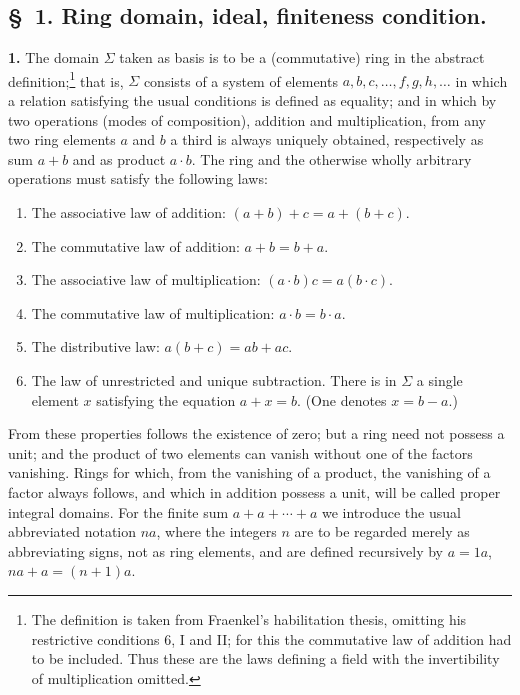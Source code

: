 \documentclass[11pt]{article}
\begin{document}
\subsection*{\S~1. Ring domain, ideal, finiteness condition.}

\textbf{1.} The domain $\Sigma$ taken as basis is to be a (commutative) ring in the abstract definition;\footnote{The definition is taken from Fraenkel's habilitation thesis, omitting his restrictive conditions 6, I and II; for this the commutative law of addition had to be included. Thus these are the laws defining a field with the invertibility of multiplication omitted.} that is, $\Sigma$ consists of a system of elements $a,b,c,\ldots,f,g,h,\ldots$ in which a relation satisfying the usual conditions is defined as equality; and in which by two operations (modes of composition), addition and multiplication, from any two ring elements $a$ and $b$ a third is always uniquely obtained, respectively as sum $a+b$ and as product $a\cdot b$. The ring and the otherwise wholly arbitrary operations must satisfy the following laws:
\begin{enumerate}
\item The associative law of addition: $(a+b)+c=a+(b+c)$.
\item The commutative law of addition: $a+b=b+a$.
\item The associative law of multiplication: $(a\cdot b)c=a(b\cdot c)$.
\item The commutative law of multiplication: $a\cdot b=b\cdot a$.
\item The distributive law: $a(b+c)=ab+ac$.
\item The law of unrestricted and unique subtraction. There is in $\Sigma$ a single element $x$ satisfying the equation $a+x=b$. (One denotes $x=b-a$.)
\end{enumerate}
From these properties follows the existence of zero; but a ring need not possess a unit; and the product of two elements can vanish without one of the factors vanishing. Rings for which, from the vanishing of a product, the vanishing of a factor always follows, and which in addition possess a unit, will be called proper integral domains. For the finite sum $a+a+\cdots+a$ we introduce the usual abbreviated notation $na$, where the integers $n$ are to be regarded merely as abbreviating signs, not as ring elements, and are defined recursively by $a=1a$, $na+a=(n+1)a$.
\end{document}
